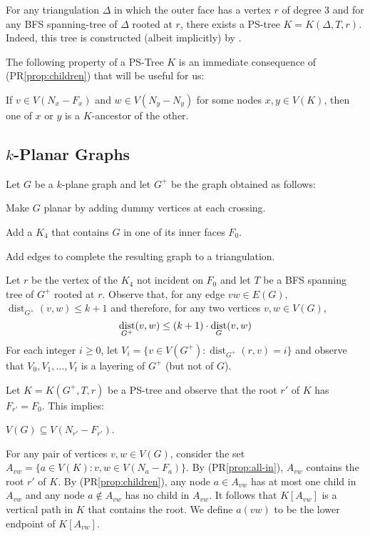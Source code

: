 \documentclass{patmorin}
\DeclareMathOperator{\dist}{dist}
\renewcommand{\proplabel}[1]{\label{prop:#1}}
\renewcommand{\propref}[1]{(PR\ref{prop:#1})}
\begin{document}
For any triangulation $\Delta$ in which the outer face has a vertex $r$ of degree 3 and for any BFS spanning-tree of $\Delta$ rooted at $r$, there exists a PS-tree $K=K(\Delta,T,r)$.  Indeed, this tree is constructed (albeit implicitly) by \citet[Proof of Lemma~X]{dujmovic.joret.ea:planar}.

The following property of a PS-Tree $K$ is an immediate consequence of \propref{children} that will be useful for us:
\begin{compactenum}[(PR5)]
  \item \proplabel{ancestors} If $v\in V(N_x-F_x)$ and $w\in V(N_y-N_y)$ for some nodes $x,y\in V(K)$, then one of $x$ or $y$ is a $K$-ancestor of the other.
\end{compactenum}


\subsection{$k$-Planar Graphs}

Let $G$ be a $k$-plane graph and let $G^+$ be the graph obtained as follows:
\begin{compactenum}
  \item Make $G$ planar by adding dummy vertices at each crossing.
  \item Add a $K_4$ that contains $G$ in one of its inner faces $F_0$.
  \item Add edges to complete the resulting graph to a triangulation.
\end{compactenum}
Let $r$ be the vertex of the $K_4$ not incident on $F_0$ and let $T$ be a BFS spanning tree of $G^+$ rooted at $r$.    Observe that, for any edge $vw\in E(G)$, $\dist_{G^+}(v,w) \le k+1$ and therefore, for any two vertices $v,w\in V(G)$,
\begin{equation} 
  \dist_{G^+}(v,w) \le (k+1)\cdot \dist_G(v,w) \eqlabel{distance-preserving}
\end{equation}
For each integer $i\ge 0$, let $V_i=\{v\in V(G^+): \dist_{G^+}(r,v)=i\}$ and observe that $V_0,V_1,\ldots,V_{t}$ is a layering of $G^+$ (but not of $G$).

Let $K=K(G^+,T,r)$ be a PS-tree and observe that the root $r'$ of $K$ has $F_{r'}=F_0$.  This implies:
\begin{compactenum}[(PR6)]
  \item \proplabel{all-in}  $V(G)\subseteq V(N_{r'}-F_{r'})$.
\end{compactenum}

For any pair of vertices $v,w\in V(G)$, consider the set $A_{vw}=\{a\in V(K): v,w\in V(N_a-F_a) \}$.  By \propref{all-in}, $A_{vw}$ contains the root $r'$ of $K$.  By \propref{children}, any node $a\in A_{vw}$ has at most one child in $A_{vw}$ and any node $a\not\in A_{vw}$ has no child in $A_{vw}$.  It follows that $K[A_{vw}]$ is a vertical path in $K$ that contains the root.  We define $a(vw)$ to be the lower endpoint of $K[A_{vw}]$.
\end{document}
